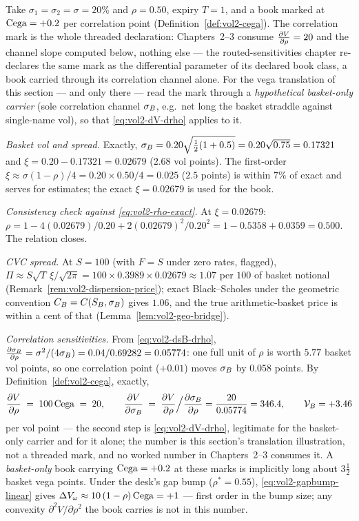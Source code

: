 \begin{example}
\label{ex:vol2-anchor}
Take $\sigma_1 = \sigma_2 = \sigma = 20\%$ and $\rho = 0.50$, expiry
$T = 1$, and a book marked at $\mathrm{Cega} = +0.2$ per correlation point
(Definition~\ref{def:vol2-cega}). The correlation mark is the whole
threaded declaration: Chapters~2--3 consume $\frac{\partial V}{\partial \rho} = 20$ and the
channel slope computed below, nothing else --- the routed-sensitivities
chapter re-declares the same mark as the differential parameter of its
declared book class, a book carried through its correlation channel
alone. For the vega translation of this section --- and only there ---
read the mark through a \emph{hypothetical basket-only carrier} (sole
correlation channel $\sigma_B$, e.g.\ net long the basket straddle against
single-name vol), so that \eqref{eq:vol2-dV-drho} applies to it.

\emph{Basket vol and spread.} Exactly,
$\sigma_B = 0.20\sqrt{\tfrac12(1+0.5)} = 0.20\sqrt{0.75} = 0.17321$ and
$\xi = 0.20 - 0.17321 = 0.02679$ ($2.68$ vol points). The first-order
$\xi \approx \sigma(1-\rho)/4 = 0.20 \times 0.50/4 = 0.025$ ($2.5$ points)
is within $7\%$ of exact and serves for estimates; the exact
$\xi = 0.02679$ is used for the book.

\emph{Consistency check against \eqref{eq:vol2-rho-exact}.} At
$\xi = 0.02679$: $\rho = 1 - 4(0.02679)/0.20 + 2(0.02679)^2/0.20^2
= 1 - 0.5358 + 0.0359 = 0.500$. The relation closes.

\emph{CVC spread.} At $S = 100$ (with $F = S$ under zero rates, flagged),
$\Pi \approx S\sqrt{T}\,\xi/\sqrt{2\pi} = 100 \times 0.3989 \times 0.02679
\approx 1.07$ per $100$ of basket notional
(Remark~\ref{rem:vol2-dispersion-price}); exact Black--Scholes under the
geometric convention $C_B = C(S_B, \sigma_B)$ gives $1.06$, and the true
arithmetic-basket price is within a cent of that
(Lemma~\ref{lem:vol2-geo-bridge}).

\emph{Correlation sensitivities.} From \eqref{eq:vol2-dsB-drho},
$\frac{\partial \sigma_B}{\partial \rho} = \sigma^2/(4\sigma_B) = 0.04/0.69282 = 0.05774$: one full unit
of $\rho$ is worth $5.77$ basket vol points, so one correlation point
($+0.01$) moves $\sigma_B$ by $0.058$ points. By
Definition~\ref{def:vol2-cega}, exactly,
\[
\frac{\partial V}{\partial \rho} \;=\; 100\,\mathrm{Cega} \;=\; 20,
\qquad
\frac{\partial V}{\partial \sigma_B} \;=\; \frac{\partial V}{\partial \rho}\Big/\frac{\partial \sigma_B}{\partial \rho}
 = \frac{20}{0.05774} = 346.4,
\qquad
\mathcal{V}_B = +3.46
\]
per vol point --- the second step is \eqref{eq:vol2-dV-drho}, legitimate
for the basket-only carrier and for it alone; the number is this
section's translation illustration, not a threaded mark, and no worked
number in Chapters~2--3 consumes it. A \emph{basket-only} book carrying
$\mathrm{Cega} = +0.2$ at these marks is implicitly long about $3\tfrac12$ basket
vega points. Under the desk's gap bump ($\rho^{*} = 0.55$),
\eqref{eq:vol2-gapbump-linear} gives
$\Delta V_{\omega} \approx 10\,(1-\rho)\,\mathrm{Cega} = +1$ --- first order in
the bump size; any convexity $\partial^2 V/\partial\rho^2$ the book
carries is not in this number.


\end{example}
